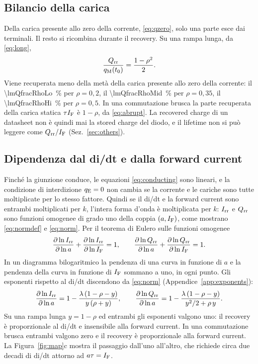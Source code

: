 \documentclass[10pt,a4paper]{scrartcl}
\let\newcommand\lmitdefine
\newcommand{\IF}{I_\mathrm{F}}
\newcommand{\Irr}{I_\mathrm{rr}}
\newcommand{\Qrr}{Q_\mathrm{rr}}
\newcommand{\qE}{q_\mathrm{E}}
\newcommand{\qM}{q_\mathrm{M}}
\begin{document}
\subsection{Bilancio della carica}
Della carica presente allo zero della corrente, \eqref{eq:qzero}, solo una parte esce dai terminali. Il resto si ricombina durante il recovery. Su una rampa lunga, da \eqref{eq:long},
\begin{equation}
\frac{\Qrr}{\qM(t_0)} = \frac{1-\rho^2}{2} .
\label{eq:fraction}
\end{equation}
Viene recuperata meno della metà della carica presente allo zero della corrente: il \SI{\lmQfracRhoLo}{\percent} per $\rho = 0,2$, il \SI{\lmQfracRhoMid}{\percent} per $\rho = 0,35$, il \SI{\lmQfracRhoHi}{\percent} per $\rho = 0,5$. In una commutazione brusca la parte recuperata della carica statica $\tau\IF$ è $1-\rho$, da \eqref{eq:abrupt}. La recovered charge di un datasheet non è quindi mai la stored charge del diodo, e il lifetime non si può leggere come $\Qrr/\IF$ (Sez.~\ref{sec:others}).

\subsection{Dipendenza dal di/dt e dalla forward current}
\label{sec:exponents}
Finché la giunzione conduce, le equazioni \eqref{eq:conducting} sono lineari, e la condizione di interdizione $\qE = 0$ non cambia se la corrente e le cariche sono tutte moltiplicate per lo stesso fattore. Quindi se il di/dt e la forward current sono entrambi moltiplicati per $k$, l'intera forma d'onda è moltiplicata per $k$: $\Irr$ e $\Qrr$ sono funzioni omogenee di grado uno della coppia $(a, \IF)$, come mostrano \eqref{eq:normdef} e \eqref{eq:norm}. Per il teorema di Eulero sulle funzioni omogenee
\begin{equation}
\frac{\partial \ln \Irr}{\partial \ln a} + \frac{\partial \ln \Irr}{\partial \ln \IF} = 1 , \qquad
\frac{\partial \ln \Qrr}{\partial \ln a} + \frac{\partial \ln \Qrr}{\partial \ln \IF} = 1 .
\label{eq:euler}
\end{equation}
In un diagramma bilogaritmico la pendenza di una curva in funzione di $a$ e la pendenza della curva in funzione di $\IF$ sommano a uno, in ogni punto. Gli esponenti rispetto al di/dt discendono da \eqref{eq:norm} (Appendice~\ref{app:exponents}):
\begin{equation}
\frac{\partial \ln \Irr}{\partial \ln a} = 1 - \frac{\lambda\,(1-\rho-y)}{y\,(\rho+y)} , \qquad
\frac{\partial \ln \Qrr}{\partial \ln a} = 1 - \frac{\lambda\,(1-\rho-y)}{y^2/2+\rho\,y} .
\label{eq:exponents}
\end{equation}
Su una rampa lunga $y = 1-\rho$ ed entrambi gli esponenti valgono uno: il recovery è proporzionale al di/dt e insensibile alla forward current. In una commutazione brusca entrambi valgono zero e il recovery è proporzionale alla forward current. La Figura~\ref{fig:map}c mostra il passaggio dall'uno all'altro, che richiede circa due decadi di di/dt attorno ad $a\tau = \IF$.
\end{document}
